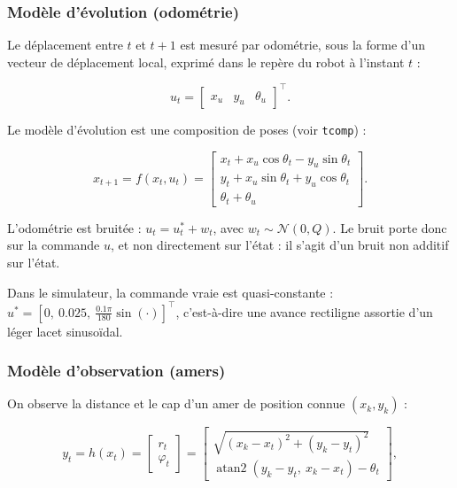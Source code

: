 \documentclass[11pt]{article}
\theoremstyle{remark}
\theoremstyle{definition}
\begin{document}
\subsubsection{Modèle d'évolution (odométrie)}

Le déplacement entre $t$ et $t+1$ est mesuré par odométrie, sous la forme d'un
vecteur de déplacement local, exprimé dans le repère du robot à l'instant $t$ :

\begin{equation}
u_t = \begin{bmatrix} x_u & y_u & \theta_u \end{bmatrix}^\top .
\end{equation}

Le modèle d'évolution est une composition de poses (voir \texttt{tcomp}) :

\begin{equation}
x_{t+1} = f(x_t, u_t) =
\begin{bmatrix}
x_t + x_u\cos\theta_t - y_u\sin\theta_t \\[2pt]
y_t + x_u\sin\theta_t + y_u\cos\theta_t \\[2pt]
\theta_t + \theta_u
\end{bmatrix}.
\end{equation}

L'odométrie est bruitée : $u_t = u_t^* + w_t$, avec $w_t \sim \mathcal{N}(0, Q)$. Le bruit
porte donc sur la commande $u$, et non directement sur l'état : il s'agit d'un bruit
non additif sur l'état.

Dans le simulateur, la commande vraie est quasi-constante :
$u^* = [0,\ 0.025,\ \tfrac{0.1\pi}{180}\sin(\cdot)]^\top$, c'est-à-dire une avance rectiligne
assortie d'un léger lacet sinusoïdal.

\subsubsection{Modèle d'observation (amers)}

On observe la distance et le cap d'un amer de position connue $(x_k, y_k)$ :

\begin{equation}
y_t = h(x_t) =
\begin{bmatrix}
r_t \\[2pt] \varphi_t
\end{bmatrix}
=
\begin{bmatrix}
\sqrt{(x_k - x_t)^2 + (y_k - y_t)^2} \\[2pt]
\operatorname{atan2}(y_k - y_t,\ x_k - x_t) - \theta_t
\end{bmatrix},
\end{equation}
\end{document}
